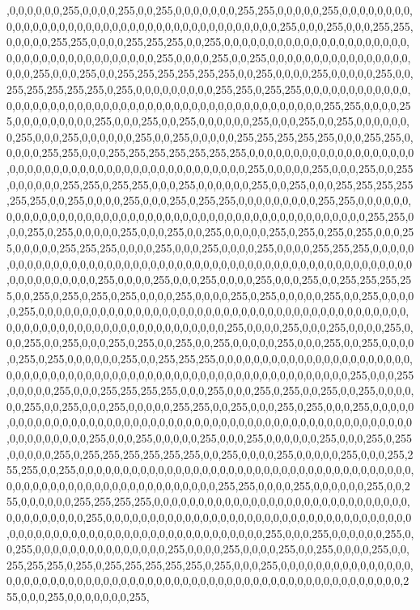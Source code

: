\begin{DoxyCompactItemize}
,0,0,0,0,0,0,255,0,0,0,0,255,0,0,255,0,0,0,0,0,0,0,255,255,0,0,0,0,0,255,0,0,0,0,0,0,0,0,0,0,0,0,0,0,0,0,0,0,0,0,0,0,0,0,0,0,0,0,0,0,0,0,0,0,0,0,0,0,0,255,0,0,0,255,0,0,0,255,255,0,0,0,0,0,255,255,0,0,0,0,255,255,255,0,0,255,0,0,0,0,0,0,0,0,0,0,0,0,0,0,0,0,0,0,0,0,0,0,0,0,0,0,0,0,0,0,0,0,0,0,0,0,0,0,255,0,0,0,0,255,0,0,255,0,0,0,0,0,0,0,0,0,0,0,0,0,0,0,0,0,0,0,255,0,0,0,255,0,0,255,255,255,255,255,255,0,0,255,0,0,0,0,255,0,0,0,0,0,255,0,0,255,255,255,255,255,0,255,0,0,0,0,0,0,0,0,0,255,255,0,255,255,0,0,0,0,0,0,0,0,0,0,0,0,0,0,0,0,0,0,0,0,0,0,0,0,0,0,0,0,0,0,0,0,0,0,0,0,0,0,0,0,0,0,0,0,0,0,0,0,255,255,0,0,0,0,255,0,0,0,0,0,0,0,0,0,255,0,0,0,255,0,0,255,0,0,0,0,0,0,255,0,0,0,255,0,0,255,0,0,0,0,0,0,0,255,0,0,0,255,0,0,0,0,0,0,255,0,0,255,0,0,0,0,0,255,255,255,255,255,0,0,0,255,255,0,0,0,0,0,255,255,0,0,0,255,255,255,255,255,255,255,0,0,0,0,0,0,0,0,0,0,0,0,0,0,0,0,0,0,0,0,0,0,0,0,0,0,0,0,0,0,0,0,0,0,0,0,0,0,0,0,0,0,0,0,0,0,255,0,0,0,0,0,255,0,0,0,255,0,0,255,0,0,0,0,0,0,255,255,0,255,255,0,0,0,255,0,0,0,0,0,0,255,0,0,255,0,0,0,255,255,255,255,255,255,0,0,255,0,0,0,0,255,0,0,0,255,0,255,255,0,0,0,0,0,0,0,0,0,255,255,0,0,0,0,0,0,0,0,0,0,0,0,0,0,0,0,0,0,0,0,0,0,0,0,0,0,0,0,0,0,0,0,0,0,0,0,0,0,0,0,0,0,0,0,0,0,0,255,255,0,0,0,255,0,255,0,0,0,0,0,255,0,0,0,255,0,0,255,0,0,0,0,0,255,0,255,0,255,0,255,0,0,0,255,0,0,0,0,0,255,255,255,0,0,0,0,255,0,0,0,255,0,0,0,0,255,0,0,0,0,255,255,255,0,0,0,0,0,0,0,0,0,0,0,0,0,0,0,0,0,0,0,0,0,0,0,0,0,0,0,0,0,0,0,0,0,0,0,0,0,0,0,0,0,0,0,0,0,0,0,0,0,0,0,0,0,0,0,0,0,0,0,0,0,255,0,0,0,0,255,0,0,0,255,0,0,0,0,255,0,0,0,255,0,0,255,255,255,255,0,0,255,0,255,0,255,0,255,0,0,0,0,255,0,0,0,0,255,0,255,0,0,0,0,0,255,0,0,255,0,0,0,0,0,255,0,0,0,0,0,0,0,0,0,0,0,0,0,0,0,0,0,0,0,0,0,0,0,0,0,0,0,0,0,0,0,0,0,0,0,0,0,0,0,0,0,0,0,0,0,0,0,0,0,0,0,0,0,0,0,0,0,0,0,0,0,0,0,0,0,0,0,255,0,0,0,0,255,0,0,0,255,0,0,0,0,255,0,0,0,255,0,0,255,0,0,0,255,0,255,0,0,255,0,0,255,0,0,0,0,0,255,0,0,0,255,0,0,255,0,0,0,0,0,255,0,255,0,0,0,0,0,0,255,0,0,255,255,255,0,0,0,0,0,0,0,0,0,0,0,0,0,0,0,0,0,0,0,0,0,0,0,0,0,0,0,0,0,0,0,0,0,0,0,0,0,0,0,0,0,0,0,0,0,0,0,0,0,0,0,0,0,0,0,0,0,0,0,0,0,255,0,0,0,255,0,0,0,0,0,255,0,0,0,255,255,255,255,0,0,0,255,0,0,0,255,0,255,0,0,255,0,0,255,0,0,0,0,0,0,255,0,0,255,0,0,0,255,0,0,0,0,0,255,255,0,0,255,0,0,0,255,0,255,0,0,0,255,0,0,0,0,0,0,0,0,0,0,0,0,0,0,0,0,0,0,0,0,0,0,0,0,0,0,0,0,0,0,0,0,0,0,0,0,0,0,0,0,0,0,0,0,0,0,0,0,0,0,0,0,0,0,0,0,0,0,0,0,255,0,0,0,255,0,0,0,0,0,255,0,0,0,255,0,0,0,0,0,0,255,0,0,0,255,0,255,0,0,0,0,0,255,0,255,255,255,255,255,255,0,0,255,0,0,0,0,255,0,0,0,0,0,255,0,0,0,255,255,255,0,0,255,0,0,0,0,0,0,0,0,0,0,0,0,0,0,0,0,0,0,0,0,0,0,0,0,0,0,0,0,0,0,0,0,0,0,0,0,0,0,0,0,0,0,0,0,0,0,0,0,0,0,0,0,0,0,0,0,0,0,0,0,0,0,255,255,0,0,0,0,255,0,0,0,0,0,0,255,0,0,255,0,0,0,0,0,0,255,255,255,255,0,0,0,0,0,0,0,0,0,0,0,0,0,0,0,0,0,0,0,0,0,0,0,0,0,0,0,0,0,0,0,0,0,0,0,0,0,0,255,0,0,0,0,0,0,0,0,0,0,0,0,0,0,0,0,0,0,0,0,0,0,0,0,0,0,0,0,0,0,0,0,0,0,0,0,0,0,0,0,0,0,0,0,0,0,0,0,0,0,0,0,0,0,0,0,0,0,0,0,0,0,0,0,255,0,0,0,255,0,0,0,0,0,0,255,0,0,255,0,0,0,0,0,0,0,0,0,0,0,0,0,0,0,255,0,0,0,0,255,0,0,0,0,255,0,0,255,0,0,0,0,255,0,0,255,255,255,0,255,0,255,255,255,255,255,0,255,0,0,0,255,0,0,0,0,0,0,0,0,0,0,0,0,0,0,0,0,0,0,0,0,0,0,0,0,0,0,0,0,0,0,0,0,0,0,0,0,0,0,0,0,0,0,0,0,0,0,0,0,0,0,0,0,0,0,0,0,0,0,0,0,255,0,0,0,255,0,0,0,0,0,0,0,255,
\end{DoxyCompactItemize}
